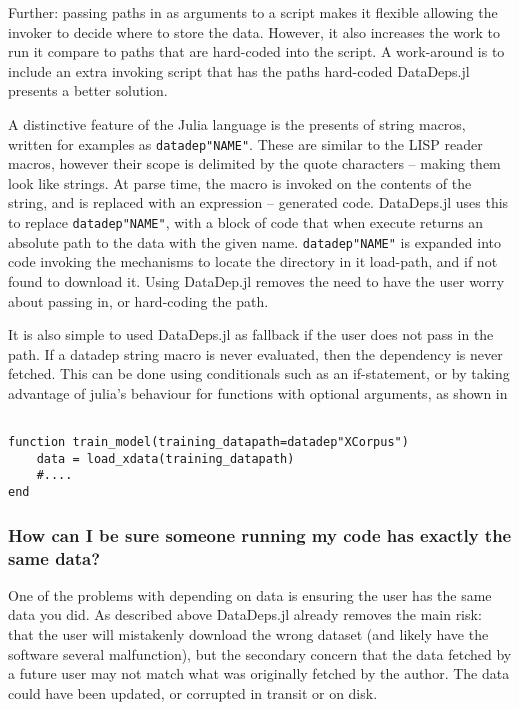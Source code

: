 \documentclass{jors}
\newcommand{\datadep}[1]{\texttt{datadep"{}#1"{}}}
\begin{document}
Further: passing paths in as arguments to a script makes it flexible allowing the invoker to decide where to store the data.
However, it also increases the work to run it compare to paths that are hard-coded into the script.
A work-around is to include an extra invoking script that has the paths hard-coded
DataDeps.jl presents a better solution.

A distinctive feature of the Julia language is the presents of string macros, written for examples as \datadep{NAME}.
These are similar to the LISP reader macros, however their scope is delimited by the quote characters -- making them look like strings.
At parse time, the macro is invoked on the contents of the string, and is replaced with an expression -- generated code.
DataDeps.jl uses this to replace \datadep{NAME}, with a block of code that when execute returns an absolute path to the data with the given name.
\datadep{NAME} is expanded into code invoking the mechanisms to locate the directory in it load-path, and if not found to download it.
Using DataDep.jl removes the need to have the user worry about passing in, or hard-coding the path.

It is also simple to used DataDeps.jl as fallback if the user does not pass in the path.
If a datadep string macro is never evaluated, then the dependency is never fetched.
This can be done using conditionals such as an if-statement,
or by taking advantage of julia's behaviour for functions with optional arguments, as shown in 


\begin{lstlisting}[frame=single, caption={Example of a function with an optional argument. If an argument is passed to the function then the datadep string macro will never be evaluated and thus will never be fetched}, label={lst:function}] 

function train_model(training_datapath=datadep"XCorpus")
	data = load_xdata(training_datapath)
	#....
end
\end{lstlisting}


\subsubsection{How can I be sure someone running my code has exactly the same data?}
One of the problems with depending on data is ensuring the user has the same data you did.
As described above DataDeps.jl already removes the main risk: that the user will mistakenly download the wrong dataset (and likely have the software several malfunction), but the secondary concern that the data fetched by a future user may not match what was originally fetched by the author.
The data could have been updated, or corrupted in transit or on disk.
\end{document}
